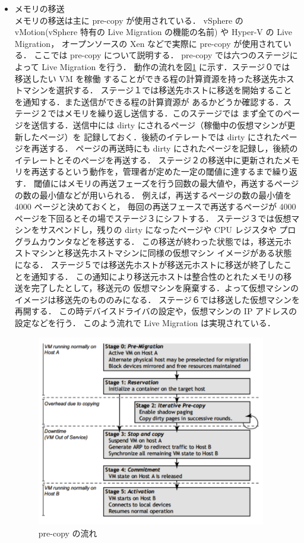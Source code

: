 \documentclass[graduation-thesis]{mlarticle}
\begin{document}
\begin{itemize}
\item メモリの移送\\
      メモリの移送は主に pre-copy \cite{Clark:2005:LMV} が使用されている．
vSphere\cite{vsphere} の vMotion(vSphere 特有の Live Migration の機能の名前)
\cite{Sreekanth:2012:VV5} 
や Hyper-V\cite{hyper-v} の Live Migration，
オープンソースの Xen などで実際に pre-copy が使用されている．
ここでは pre-copy について説明する．
pre-copy では六つのステージによって Live Migration を行う．
動作の流れを図\ref{pre-copy} \cite{Clark:2005:LMV} に示す．ステージ０では 移送したい VM を稼働
することができる程の計算資源を持った移送先ホストマシンを選択する．
ステージ１では移送先ホストに移送を開始することを通知する．また送信ができる程の計算資源が
あるかどうか確認する．ステージ２ではメモリを繰り返し送信する．このステージでは
まず全てのページを送信する．送信中には dirty にされるページ（稼働中の仮想マシンが更新したページ）を
記録しておく．後続のイテレートでは dirty にされたページを再送する．
ページの再送時にも dirty にされたページを記録し，後続のイテレートとそのページを再送する．
ステージ２の移送中に更新されたメモリを再送するという動作を，管理者が定めた一定の閾値に達するまで繰り返す．
閾値にはメモリの再送フェーズを行う回数の最大値や，再送するページの数の最小値などが用いられる．
例えば，再送するページの数の最小値を 4000 ページと決めておくと，
毎回の再送フェースで再送するページが 4000 ページを下回るとその場でステージ３にシフトする．
ステージ３では仮想マシンをサスペンドし，残りの dirty になったページや CPU レジスタや
プログラムカウンタなどを移送する．
この移送が終わった状態では，移送元ホストマシンと移送先ホストマシンに同様の仮想マシン
イメージがある状態になる．
ステージ５では移送先ホストが移送元ホストに移送が終了したことを通知する．
この通知により移送元ホストは整合性のとれたメモリの移送を完了したとして，移送元の
仮想マシンを廃棄する．よって仮想マシンのイメージは移送先のもののみになる．
ステージ６では移送した仮想マシンを再開する．
この時デバイスドライバの設定や，仮想マシンの IP アドレスの設定などを行う．
このよう流れで Live Migration は実現されている．

\begin{figure}[H]\begin{center}\includegraphics[width=10.0cm]{./img/pre-copy.png}\caption{ pre-copy の流れ}\label{pre-copy}\end{center}\end{figure}
\end{itemize}
\end{document}
